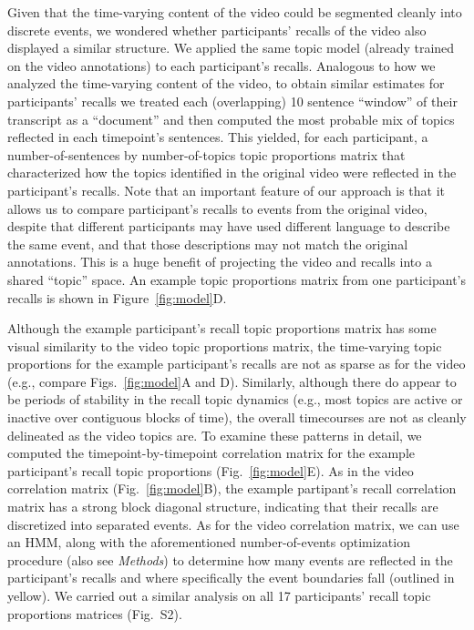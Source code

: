 \documentclass{article}
\newcommand{\corrmats}{S2}
\begin{document}
Given that the time-varying content of the video could be segmented cleanly into discrete events, we wondered whether participants' recalls of the video also displayed a similar structure.  We applied the same topic model (already trained on the video annotations) to each participant's recalls.  Analogous to how we analyzed the time-varying content of the video, to obtain similar estimates for participants' recalls we treated each (overlapping) 10 sentence ``window'' of their transcript as a ``document'' and then computed the most probable mix of topics reflected in each timepoint's sentences.  This yielded, for each participant, a number-of-sentences by number-of-topics topic proportions matrix that characterized how the topics identified in the original video were reflected in the participant's recalls.  Note that an important feature of our approach is that it allows us to compare participant's recalls to events from the original video, despite that different participants may have used different language to describe the same event, and that those descriptions may not match the original annotations.  This is a huge benefit of projecting the video and recalls into a shared ``topic'' space.  An example topic proportions matrix from one participant's recalls is shown in Figure~\ref{fig:model}D.

Although the example participant's recall topic proportions matrix has some visual similarity to the video topic proportions matrix, the time-varying topic proportions for the example participant's recalls are not as sparse as for the video (e.g., compare Figs.~\ref{fig:model}A and D).  Similarly, although there do appear to be periods of stability in the recall topic dynamics (e.g., most topics are active or inactive over contiguous blocks of time), the overall timecourses are not as cleanly delineated as the video topics are.  To examine these patterns in detail, we computed the timepoint-by-timepoint correlation matrix for the example participant's recall topic proportions (Fig.~\ref{fig:model}E).  As in the video correlation matrix (Fig.~\ref{fig:model}B), the example partipant's recall correlation matrix has a strong block diagonal structure, indicating that their recalls are discretized into separated events.  As for the video correlation matrix, we can use an HMM, along with the aforementioned number-of-events optimization procedure (also see \textit{Methods}) to determine how many events are reflected in the participant's recalls and where specifically the event boundaries fall (outlined in yellow).  We carried out a similar analysis on all 17 participants' recall topic proportions matrices (Fig.~\corrmats).
\end{document}
